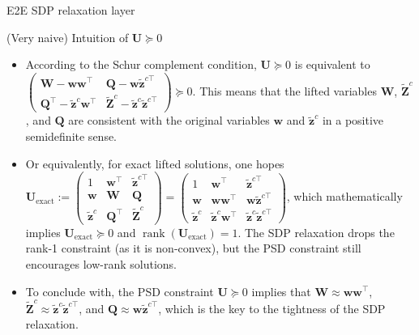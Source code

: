\documentclass[10pt,aspectratio=169]{beamer}
\begin{document}
\begin{frame}{E2E SDP relaxation layer}
    \begin{block}{\footnotesize (Very naive) Intuition of $\mathbf{U} \succeq 0$}
    \scriptsize
    \begin{itemize}
      \item  According to the Schur complement condition, $\mathbf{U} \succeq 0$ is equivalent to $\begin{pmatrix}
        \mathbf{W} - \mathbf{w}\mathbf{w}^\top & \mathbf{Q} - \mathbf{w}\mathbf{\tilde z}^{c\top}\\
        \mathbf{Q}^\top - \mathbf{\tilde z}^c \mathbf{w}^\top & \mathbf{\tilde Z}^c - \mathbf{\tilde z}^c \mathbf{\tilde z}^{c\top} 
      \end{pmatrix}\succeq 0$. This means that the lifted variables $\mathbf{W}$, $\mathbf{\tilde Z}^c$, and $\mathbf{Q}$ are consistent with the original variables $\mathbf{w}$ and $\mathbf{\tilde z}^c$ in a positive semidefinite sense. 
      \item Or equivalently, for exact lifted solutions, one hopes $\mathbf{U}_{\text{exact}} :=
      \begin{pmatrix}
        1 & \mathbf{w}^\top & \mathbf{\tilde z}^{c\top}\\
        \mathbf{w} & \mathbf{W} & \mathbf{Q}\\
        \mathbf{\tilde z}^c & \mathbf{Q}^\top & \mathbf{\tilde Z}^c
      \end{pmatrix} = \begin{pmatrix}
        1 & \mathbf{w}^\top & \mathbf{\tilde z}^{c\top}\\
        \mathbf{w} & \mathbf{w}\mathbf{w}^\top & \mathbf{w}\mathbf{\tilde z}^{c\top}\\
        \mathbf{\tilde z}^c & \mathbf{\tilde z}^c \mathbf{w}^\top & \mathbf{\tilde z}^c \mathbf{\tilde z}^{c\top}
      \end{pmatrix}$, which mathematically implies $\mathbf{U}_{\text{exact}} \succeq 0$ and $\operatorname{rank}(\mathbf{U}_{\text{exact}}) = 1$. The SDP relaxation drops the rank-1 constraint (as it is non-convex), but the PSD constraint still encourages low-rank solutions.
      \item To conclude with, the PSD constraint $\mathbf{U} \succeq 0$ implies that $\mathbf{W} \approx \mathbf{w}\mathbf{w}^\top$, $\mathbf{\tilde Z}^c \approx \mathbf{\tilde z}^c \mathbf{\tilde z}^{c\top}$, and $\mathbf{Q} \approx \mathbf{w}\mathbf{\tilde z}^{c\top}$, which is the key to the tightness of the SDP relaxation.
    \end{itemize}
  \end{block}


\end{frame}
\end{document}
